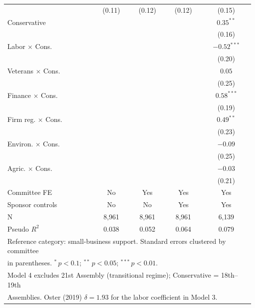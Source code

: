\documentclass[11pt]{article}
\begin{document}
\begin{table}[htbp]
\begin{tabular}{lcccc}
                   & (0.11)        & (0.12)        & (0.12)        & (0.15)        \\[3pt]
Conservative       &               &               &               & $0.35^{**}$   \\
                   &               &               &               & (0.16)        \\[3pt]
Labor $\times$ Cons.       &       &               &               & $-0.52^{***}$ \\
                           &       &               &               & (0.20)        \\[3pt]
Veterans $\times$ Cons.    &       &               &               & $0.05$        \\
                           &       &               &               & (0.25)        \\[3pt]
Finance $\times$ Cons.     &       &               &               & $0.58^{***}$  \\
                           &       &               &               & (0.19)        \\[3pt]
Firm reg. $\times$ Cons.   &       &               &               & $0.49^{**}$   \\
                           &       &               &               & (0.23)        \\[3pt]
Environ. $\times$ Cons.    &       &               &               & $-0.09$       \\
                           &       &               &               & (0.25)        \\[3pt]
Agric. $\times$ Cons.      &       &               &               & $-0.03$       \\
                           &       &               &               & (0.21)        \\
\midrule
Committee FE       & No            & Yes           & Yes           & Yes           \\
Sponsor controls   & No            & No            & Yes           & Yes           \\
N                  & 8,961         & 8,961         & 8,961         & 6,139         \\
Pseudo $R^2$       & 0.038         & 0.052         & 0.064         & 0.079         \\
\bottomrule
\multicolumn{5}{l}{\footnotesize Reference category: small-business support. Standard errors clustered by committee} \\
\multicolumn{5}{l}{\footnotesize in parentheses. $^{*}$\,$p<0.1$; $^{**}$\,$p<0.05$; $^{***}$\,$p<0.01$.} \\
\multicolumn{5}{l}{\footnotesize Model 4 excludes 21st Assembly (transitional regime); Conservative = 18th--19th} \\
\multicolumn{5}{l}{\footnotesize Assemblies. Oster (2019) $\delta = 1.93$ for the labor coefficient in Model 3.} \\
\end{tabular}
\end{table}
\end{document}
